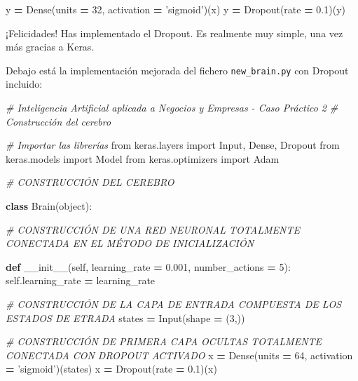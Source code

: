 \documentclass[]{book}
\newenvironment{Shaded}{\begin{snugshade}}{\end{snugshade}}
\newcommand{\BuiltInTok}[1]{#1}
\newcommand{\CommentTok}[1]{\textcolor[rgb]{0.56,0.35,0.01}{\textit{#1}}}
\newcommand{\DecValTok}[1]{\textcolor[rgb]{0.00,0.00,0.81}{#1}}
\newcommand{\FloatTok}[1]{\textcolor[rgb]{0.00,0.00,0.81}{#1}}
\newcommand{\FunctionTok}[1]{\textcolor[rgb]{0.00,0.00,0.00}{#1}}
\newcommand{\ImportTok}[1]{#1}
\newcommand{\KeywordTok}[1]{\textcolor[rgb]{0.13,0.29,0.53}{\textbf{#1}}}
\newcommand{\NormalTok}[1]{#1}
\newcommand{\OperatorTok}[1]{\textcolor[rgb]{0.81,0.36,0.00}{\textbf{#1}}}
\newcommand{\StringTok}[1]{\textcolor[rgb]{0.31,0.60,0.02}{#1}}
\newcommand{\VariableTok}[1]{\textcolor[rgb]{0.00,0.00,0.00}{#1}}
\begin{document}
\begin{Shaded}
\begin{Highlighting}[]
\NormalTok{    y }\OperatorTok{=}\NormalTok{ Dense(units }\OperatorTok{=} \DecValTok{32}\NormalTok{, activation }\OperatorTok{=} \StringTok{'sigmoid'}\NormalTok{)(x)}
\NormalTok{    y }\OperatorTok{=}\NormalTok{ Dropout(rate }\OperatorTok{=} \FloatTok{0.1}\NormalTok{)(y)}
\end{Highlighting}
\end{Shaded}

¡Felicidades! Has implementado el Dropout. Es realmente muy simple, una vez más gracias a Keras.

Debajo está la implementación mejorada del fichero \texttt{new\_brain.py} con Dropout incluido:

\begin{Shaded}
\begin{Highlighting}[]
\CommentTok{# Inteligencia Artificial aplicada a Negocios y Empresas - Caso Práctico 2}
\CommentTok{# Construcción del cerebro}

\CommentTok{# Importar las librerías}
\ImportTok{from}\NormalTok{ keras.layers }\ImportTok{import}\NormalTok{ Input, Dense, Dropout}
\ImportTok{from}\NormalTok{ keras.models }\ImportTok{import}\NormalTok{ Model}
\ImportTok{from}\NormalTok{ keras.optimizers }\ImportTok{import}\NormalTok{ Adam}

\CommentTok{# CONSTRUCCIÓN DEL CEREBRO}

\KeywordTok{class}\NormalTok{ Brain(}\BuiltInTok{object}\NormalTok{):}

    \CommentTok{# CONSTRUCCIÓN DE UNA RED NEURONAL TOTALMENTE CONECTADA EN EL MÉTODO DE INICIALIZACIÓN}

    \KeywordTok{def} \FunctionTok{__init__}\NormalTok{(}\VariableTok{self}\NormalTok{, learning_rate }\OperatorTok{=} \FloatTok{0.001}\NormalTok{, number_actions }\OperatorTok{=} \DecValTok{5}\NormalTok{):}
        \VariableTok{self}\NormalTok{.learning_rate }\OperatorTok{=}\NormalTok{ learning_rate}

        \CommentTok{# CONSTRUCCIÓN DE LA CAPA DE ENTRADA COMPUESTA DE LOS ESTADOS DE ETRADA}
\NormalTok{        states }\OperatorTok{=}\NormalTok{ Input(shape }\OperatorTok{=}\NormalTok{ (}\DecValTok{3}\NormalTok{,))}

        \CommentTok{# CONSTRUCCIÓN DE PRIMERA CAPA OCULTAS TOTALMENTE CONECTADA CON DROPOUT ACTIVADO}
\NormalTok{        x }\OperatorTok{=}\NormalTok{ Dense(units }\OperatorTok{=} \DecValTok{64}\NormalTok{, activation }\OperatorTok{=} \StringTok{'sigmoid'}\NormalTok{)(states)}
\NormalTok{        x }\OperatorTok{=}\NormalTok{ Dropout(rate }\OperatorTok{=} \FloatTok{0.1}\NormalTok{)(x)}


\end{Highlighting}
\end{Shaded}
\end{document}
